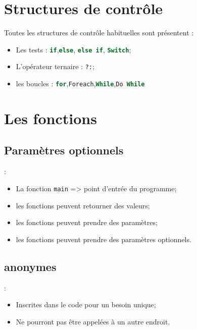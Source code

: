 \documentclass[10pt]{beamer}
\begin{document}
\section{Structures de contrôle}
\begin{frame}[fragile,t]{\secname}
    Toutes les structures de contrôle habituelles sont présentent :
    \begin{itemize}
        \item Les tests : \lstinline[language=sql]!if!,\lstinline[language=sql]!else!, \lstinline[language=sql]!else if!, \lstinline[language=sql]!Switch!;
        \item L'opérateur ternaire : \lstinline[language=sql]!?:!;
        \item les boucles : \lstinline[language=sql]!for!,\lstinline[language=sql]!Foreach!,\lstinline[language=sql]!While!,\lstinline[language=sql]!Do While!
    \end{itemize}
\end{frame}

\section{Les fonctions}
\subsection{Paramètres optionnels}
\begin{frame}[fragile,t]{\secname : \subsecname}
    \begin{itemize}
        \item La fonction \lstinline[language=sql]!main! => point d’entrée du programme;
        \item les fonctions peuvent retourner des valeurs;
        \item les fonctions peuvent prendre des paramètres;
        \item les fonctions peuvent prendre des paramètres optionnels.
    \end{itemize}
    
\end{frame}

\subsection{anonymes}
\begin{frame}[fragile,t]{\secname : \subsecname}
    \begin{itemize}
        \item Inscrites dans le code pour un besoin unique;
        \item Ne pourront pas être appelées à un autre endroit.
    \end{itemize}
    
\end{frame}
\end{document}
